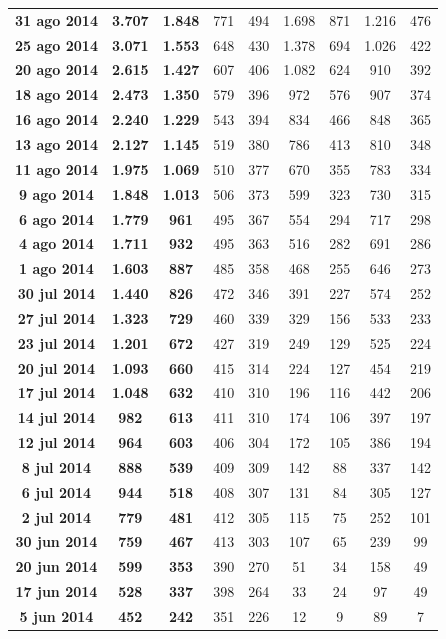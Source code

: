 \documentclass[a4paper,11pt]{article}
\numberwithin{equation}{section}
\begin{document}
\begin{table}[H]
\begin{tabular}{c|cc|cc|cc|cc}
\bf 31 ago 2014		&\bf 3.707		&\bf 1.848	&	771	&	494	&	1.698&	871	&	1.216&	476             \\
\bf 25 ago 2014		&\bf 3.071		&\bf 1.553	&	648	&	430	&	1.378&	694	&	1.026&	422             \\
\bf 20 ago 2014		&\bf 2.615		&\bf 1.427	&	607	&	406	&	1.082&	624	&	910	&	392\\
\bf 18 ago 2014		&\bf 2.473		&\bf 1.350	&	579	&	396	&	972	&	576	&	907	&	374 \\
\bf 16 ago 2014		&\bf 2.240		&\bf 1.229	&	543	&	394	&	834	&	466	&	848	&	365 \\
\bf 13 ago 2014		&\bf 2.127		&\bf 1.145	&	519	&	380	&	786	&	413	&	810	&	348 \\
\bf 11 ago 2014		&\bf 1.975		&\bf 1.069	&	510	&	377	&	670	&	355	&	783	&	334 \\
\bf 9 ago 2014		&\bf 1.848		&\bf 1.013	&	506	&	373	&	599	&	323	&	730	&	315  \\
\bf 6 ago 2014		&\bf 1.779		&\bf 961	&	495	&	367	&	554	&	294	&	717	&	298   \\
\bf 4 ago 2014		&\bf 1.711		&\bf 932	&	495	&	363	&	516	&	282	&	691	&	286   \\
\bf 1 ago 2014		&\bf 1.603		&\bf 887	&	485	&	358	&	468	&	255	&	646	&	273   \\
\bf 30 jul 2014		&\bf 1.440		&\bf 826	&	472	&	346	&	391	&	227	&	574	&	252   \\
\bf 27 jul 2014		&\bf 1.323		&\bf 729	&	460	&	339	&	329	&	156	&	533	&	233   \\
\bf 23 jul 2014		&\bf 1.201		&\bf 672	&	427	&	319	&	249	&	129	&	525	&	224   \\
\bf 20 jul 2014		&\bf 1.093		&\bf 660	&	415	&	314	&	224	&	127	&	454	&	219   \\
\bf 17 jul 2014		&\bf 1.048		&\bf 632	&	410	&	310	&	196	&	116	&	442	&	206   \\
\bf 14 jul 2014		&\bf 982		&\bf 613	&	411	&	310	&	174	&	106	&	397	&	197     \\
\bf 12 jul 2014		&\bf 964		&\bf 603	&	406	&	304	&	172	&	105	&	386	&	194\\
\bf 8 jul 2014		&\bf 888		&\bf 539	&	409	&	309	&	142	&	88	&	337	&	142  \\
\bf 6 jul 2014		&\bf 944		&\bf 518	&	408	&	307	&	131	&	84	&	305	&	127  \\
\bf 2 jul 2014		&\bf 779		&\bf 481	&	412	&	305	&	115	&	75	&	252	&	101  \\
\bf 30 jun 2014		&\bf 759		&\bf 467	&	413	&	303	&	107	&	65	&	239	&	99  \\
\bf 20 jun 2014		&\bf 599		&\bf 353	&	390	&	270	&	51	&	34	&	158	&	49   \\
\bf 17 jun 2014		&\bf 528		&\bf 337	&	398	&	264	&	33	&	24	&	97	&	49    \\
\bf 5 jun 2014		&\bf 452		&\bf 242	&	351	&	226	&	12	&	9	&	89	&	7       \\
\end{tabular}
\end{table}
\end{document}
